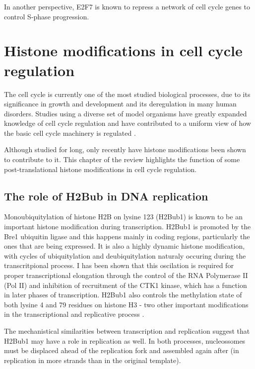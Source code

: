 \documentclass[11pt,twoside,a4paper]{report}
\begin{document}
			
			In another perspective, E2F7 is known to repress a network of cell cycle genes to control S-phase progression.\cite{Westendorp2012}
			\cite{Moon2008}
			\cite{Meserve2012}
			\cite{Chen2012}

	\section{Histone modifications in cell cycle regulation}
	The cell cycle is currently one of the most studied biological processes, due to its significance in growth and development and its deregulation in many human disorders. Studies using a diverse set of model organisms have greatly expanded knowledge of cell cycle regulation and have contributed to a uniform view of how the basic cell cycle machinery is regulated  \cite{Raynaud2014a}.
	
	Although studied for long, only recently have histone modifications been shown to contribute to it. This chapter of the review highlights the function of some post-translational histone modifications in cell cycle regulation.
		
		\subsection{The role of H2Bub in DNA replication}
		Monoubiquitylation of histone H2B on lysine 123 (H2Bub1) is known to be an important histone modification during transcription. H2Bub1 is promoted by the Bre1 ubiquitin ligase and this happens mainly in coding regions, particularly the ones that are being expressed. It is also a highly dynamic histone modification, with cycles of ubiquitylation and deubiquitylation naturaly occuring during the transcritpional process. I has been shown that this oscilation is required for proper transcriptional elongation through the control of the RNA Polymerase II (Pol II) and inhibition of recruitment of the CTK1 kinase, which has a function in later phases of transcription. H2Bub1 also controls the methylation state of both lysine 4 and 79 residues on histone H3 - two other important modifications in the transcriptional and replicative process \cite{Kouzarides2007}.
		
		The mechanistical similarities between transcription and replication suggest that H2Bub1 may have a role in replication as well. In both processes, nucleossomes must be displaced ahead of the replication fork and assembled again after (in replication in more strands than in the original template).
		
\end{document}
